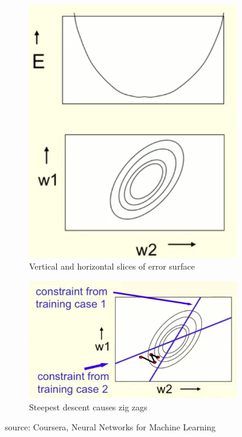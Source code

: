 \documentclass[a4paper,11pt]{article}
\begin{document}
\begin{figure}[h!]
	\centering
	\begin{subfigure}{.5\textwidth}
  		\centering
		\includegraphics[scale=0.3]{images/gradient_descent_ellipses.png}
		\caption{Vertical and horizontal slices of error surface}
	\end{subfigure}%
	\begin{subfigure}{.5\textwidth}
  		\centering
		\includegraphics[scale=0.3]{images/gradient_descent_zigzag.png}
		\caption{Steepest descent causes zig zags}
	\end{subfigure}
	\caption{source: Coursera, Neural Networks for Machine Learning}
\end{figure}
\end{document}
